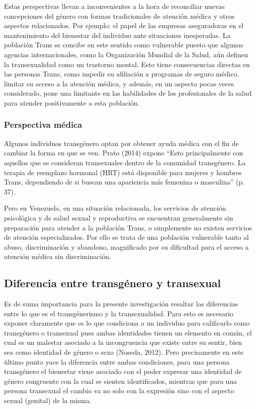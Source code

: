Estas perspectivas llevan a inconvenientes a la hora de reconciliar nuevas
concepciones del género con formas tradicionales de atención médica y otros
aspectos relacionados.
Por ejemplo: el papel de las empresas aseguradoras en el mantenimiento del
bienestar del individuo ante situaciones inesperadas.
La población Trans se concibe en este sentido como vulnerable puesto que algunas
agencias internacionales, como la Organización Mundial de la Salud, aún definen
la transexualidad como un trastorno mental.
Esto tiene consecuencias directas en las personas Trans, como impedir su
afiliación a programas de seguro médico, limitar su acceso a la atención médica,
y además, en un aspecto pocas veces considerado, pone una limitante en las
habilidades de los profesionales de la salud para atender positivamente a esta
población.

\subsubsection{Perspectiva médica}
Algunos individuos transgénero optan por obtener ayuda médica con el fin de
cambiar la forma en que se ven.
Prato (2014) expone “Esto principalmente con aquellos que se consideran
transexuales dentro de la comunidad transgénero.
La terapia de reemplazo hormonal (HRT) está disponible para mujeres y hombres
Trans, dependiendo de si buscan una apariencia más femenina o masculina” (p.
37).

Pero en Venezuela, en una situación relacionada, los servicios de atención
psicológica y de salud sexual y reproductiva se encuentran generalmente sin
preparación para atender a la población Trans, o simplemente no existen
servicios de atención especializados.
Por ello se trata de una población vulnerable tanto al abuso, discriminación y
abandono, magnificado por su dificultad para el acceso a atención médica sin
discriminación.

\subsection{Diferencia entre transgénero y transexual}
Es de suma importancia para la presente investigación resaltar las diferencias
entre lo que es el transgénerismo y la transexualidad.
Para esto es necesario exponer claramente que es lo que condiciona a un
individuo para calificarlo como transgénero o transexual pues ambas identidades
tienen un elemento en común, el cual es un malestar asociado a la incongruencia
que existe entre su sentir, bien sea como identidad de género o sexo (Noseda,
2012).
Pero precisamente en este último punto yace la diferencia entre ambas
condiciones, para una persona transgénero el bienestar viene asociado con el
poder expresar una identidad de género congruente con la cual se sienten
identificados, mientras que para una persona transexual el cambio va no solo con
la expresión sino con el aspecto sexual (genital) de la misma.

